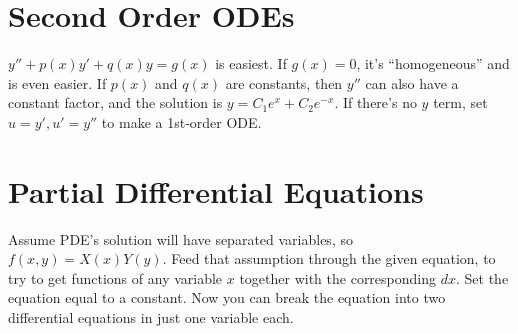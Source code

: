 \section{Second Order ODEs}

$ y'' + p(x)y' + q(x)y = g(x) $ is easiest. If $g(x) = 0$, it's
``homogeneous'' and is even easier. If $p(x)$ and $q(x)$ are
constants, then $y''$ can also have a constant factor, and the
solution is $ y = C_1e^x + C_2e^{-x} $. If there's no $y$ term, set
$u = y', u' = y''$ to make a 1st-order ODE.

\section{Partial Differential Equations}

Assume PDE's solution will have separated variables, so $ f(x, y) =
X(x)Y(y) $. Feed that assumption through the given equation, to try to
get functions of any variable $x$ together with the corresponding
$dx$. Set the equation equal to a constant. Now you can break the
equation into two differential equations in just one variable each.

